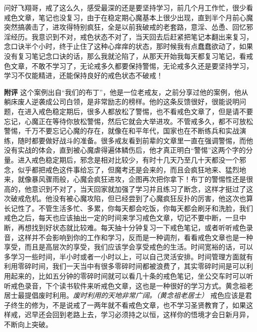 \begin{case}
    问好飞翔哥，戒了这么久，感受最深的还是要坚持学习，前几个月工作忙，很少看戒色文章，笔记也没复习，由于在稳定期心魔基本上很少出现，直到半个月前心魔突然搞袭击了，进攻得特别疯狂，全是以前我破戒的老套路，意淫、怂恿、回忆邪淫经历。我意识到不对，戒色状态不对了，当天回去后赶紧把笔记本翻出来复习，念口诀半个小时，终于止住了这种心痒痒的状态，那时候我有点蠢蠢欲动了，如果没有复习笔记念口诀的话，那么我就沦陷了，从那天开始我每天都复习笔记，看戒色文章，不敢不学习了，无论戒多久都要保持警惕，无论戒多久还是要坚持学习，学习不仅能精进，还能保持良好的戒色状态不破戒！

    \textbf{附评} 这个案例出自“我们的布丁”，他是一位老戒友，之前分享过他的案例，他从躺床废人逆袭成公司白领，是非常励志的榜样。他的这条反馈很好，很能说明问题，在进入戒色稳定期后，很多人都放松了警惕，也不看戒色文章了，但是请不要忘记，心魔正在等待你放松警惕，然后它就会大举进攻。不管戒多久，都不可放松警惕，千万不要忘记心魔的存在，就像在和平年代，国家也在不断练兵和实战演练，随时都要做好战斗的准备。很多戒友看到前辈的文章里一直在强调警惕，而他没有实战的体会，直到被心魔虐得遍体鳞伤后，他才真正明白“警惕”这两个字的分量。进入戒色稳定期后，邪念是相对比较少，有时十几天乃至几十天都没一个邪念，似乎都把戒色这件事给忘了，但魔考还是会来的，而且会疯狂地来、猛烈地来，就像暴风骤雨般，心魔会疯狂进攻，企图再次把你拿下！布丁的警惕性还是很高的，他意识到不对了，当天回家就加强了学习并且练习了断念，这样才挺过了这次破戒危机。他没有被心魔攻陷，但已经尝到了心魔疯狂反扑的厉害，他这次也算长记性了。不管生活多忙、多累，你每天都会吃饭，你每天都会刷牙和洗脸，我们戒色之后，每天也应该抽出一定的时间来学习戒色文章，切记不要中断，一旦中断，再想找到好状态就比较难。每天抽十分钟复习一下戒色笔记，或者听听戒色录音，这样并不会影响到你的工作和学习，反而是一种调剂，看看戒色文章也是一种享受，而且是高层次的享受，我们应该学会享受戒色的生活。时间宽裕的话，可以多学习一些时间，半小时或者一小时以上，可以自己灵活安排。时间管理方面就有利用零碎时间，我们一天当中有很多零碎时间都被浪费了，其实零碎时间是可以利用起来的，比如五分钟的零碎时间就可以看几十条的戒色笔记，坐公交车时可以听听戒色录音，下个读书软件来听戒色文章，这也是一种很好的学习方式。黄念祖老居士最提倡废时利用。\textit{废时利用的天地非常广阔。（黄念祖老居士）} 戒色应该是君子终生的修为，不是说戒了一两年就不看戒色文章，也不学习圣贤教育了，如果这样戒，迟早还会回到老路上去，学习必须持之以恒，这样你的悟境才会日新月异，不断向上突破。
\end{case}

